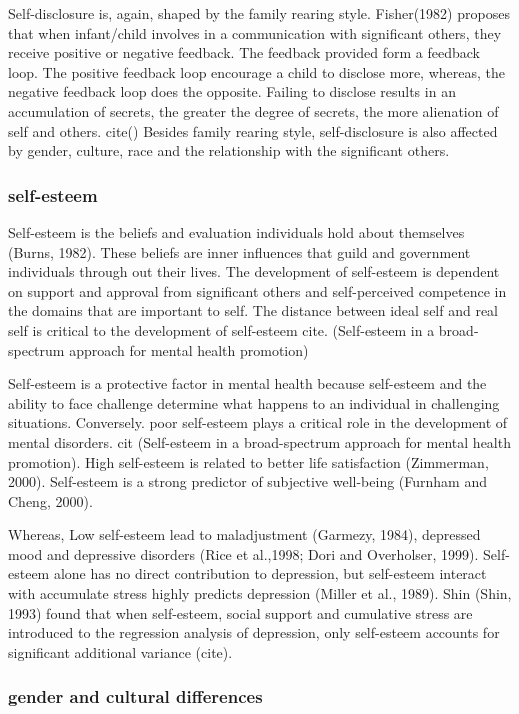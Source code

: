 Self-disclosure is, again, shaped by the family rearing style. Fisher(1982) proposes that when infant/child involves in a communication with significant others, they receive positive or negative feedback. The feedback provided form a feedback loop. The positive feedback loop encourage a child to disclose more, whereas, the negative feedback loop does the opposite. Failing to disclose results in an accumulation of secrets, the greater the degree of secrets, the more alienation of self and others. cite() Besides family rearing style, self-disclosure is also affected by gender, culture, race and the relationship with the significant others.

\subsubsection{self-esteem}
Self-esteem is the beliefs and evaluation individuals hold about themselves (Burns, 1982). These beliefs are inner influences that guild and government individuals through out their lives. The development of self-esteem is dependent on support and approval from significant others and self-perceived competence in the domains that are important to self. The distance between ideal self and real self is critical to the development of self-esteem cite. (Self-esteem in a broad-spectrum approach for mental health promotion)

Self-esteem is a protective factor in mental health because self-esteem and the ability to face challenge determine what happens to an individual in challenging situations. Conversely. poor self-esteem plays a critical role in the development of mental disorders. cit (Self-esteem in a broad-spectrum approach for mental health promotion). High self-esteem is related to better life satisfaction (Zimmerman, 2000).  Self-esteem is a strong predictor of subjective well-being (Furnham and Cheng, 2000). 

Whereas, Low self-esteem lead to maladjustment  (Garmezy, 1984), depressed mood and depressive disorders (Rice et al.,1998; Dori and Overholser, 1999). Self-esteem alone has no direct contribution to depression, but self-esteem interact with accumulate stress highly predicts depression (Miller et al., 1989).  Shin (Shin, 1993) found that when self-esteem, social support and cumulative stress are introduced to the regression analysis of depression, only self-esteem accounts for significant additional variance (cite). 

\subsubsection{gender and cultural differences}

